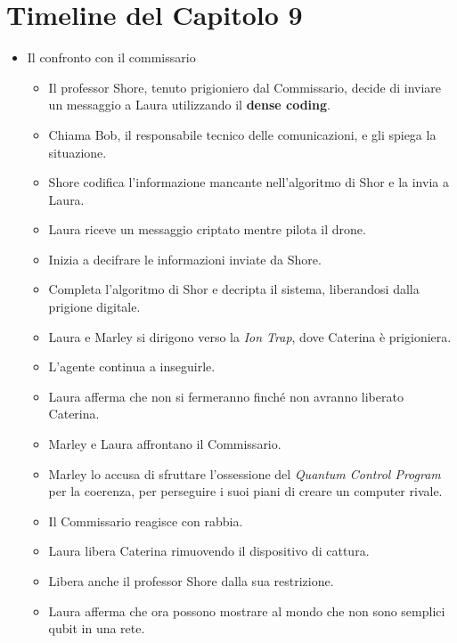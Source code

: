 \section*{Timeline del Capitolo 9}
\begin{itemize}
\item Il confronto con il commissario

  \begin{itemize}
  \item  Il professor Shore, tenuto prigioniero dal Commissario, decide di inviare un messaggio a Laura utilizzando il \textbf{dense coding}.
  \item Chiama Bob, il responsabile tecnico delle comunicazioni, e gli spiega la situazione.
  \item Shore codifica l'informazione mancante nell'algoritmo di Shor e la invia a Laura.
  \end{itemize}
  

\begin{itemize}
    \item Laura riceve un messaggio criptato mentre pilota il drone.
    \item Inizia a decifrare le informazioni inviate da Shore.
    \item Completa l'algoritmo di Shor e decripta il sistema, liberandosi dalla prigione digitale.
\end{itemize}


\begin{itemize}
    \item Laura e Marley si dirigono verso la \emph{Ion Trap}, dove Caterina è prigioniera.
    \item L'agente continua a inseguirle.
    \item Laura afferma che non si fermeranno finché non avranno liberato Caterina.
\end{itemize}


\begin{itemize}
    \item Marley e Laura affrontano il Commissario.
    \item Marley lo accusa di sfruttare l'ossessione del \emph{Quantum Control Program} per la coerenza, per perseguire i suoi piani di creare un computer rivale.
    \item Il Commissario reagisce con rabbia.
\end{itemize}

\begin{itemize}
    \item Laura libera Caterina rimuovendo il dispositivo di cattura.
    \item Libera anche il professor Shore dalla sua restrizione.
    \item Laura afferma che ora possono mostrare al mondo che non sono semplici qubit in una rete.
\end{itemize}


\end{itemize}
